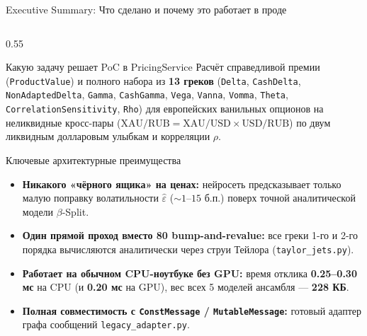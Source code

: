 \documentclass[aspectratio=169, 9pt]{beamer}
\begin{document}
\begin{frame}{Executive Summary: Что сделано и почему это работает в проде}
  \begin{columns}[T]
    \begin{column}{0.55\textwidth}
      \begin{block}{Какую задачу решает PoC в PricingService}
        Расчёт справедливой премии (\texttt{ProductValue}) и полного набора из \textbf{13 греков} (\texttt{Delta}, \texttt{CashDelta}, \texttt{NonAdaptedDelta}, \texttt{Gamma}, \texttt{CashGamma}, \texttt{Vega}, \texttt{Vanna}, \texttt{Vomma}, \texttt{Theta}, \texttt{CorrelationSensitivity}, \texttt{Rho}) для европейских ванильных опционов на неликвидные кросс-пары ($\text{XAU/RUB} = \text{XAU/USD} \times \text{USD/RUB}$) по двум ликвидным долларовым улыбкам и корреляции $\rho$.
      \end{block}

      \begin{exampleblock}{Ключевые архитектурные преимущества}
        \begin{itemize}
          \item \textbf{Никакого «чёрного ящика» на ценах:} нейросеть предсказывает только малую поправку волатильности $\hat{\varepsilon}$ ($\sim 1\text{--}15$ б.п.) поверх точной аналитической модели $\beta$-Split.
          \item \textbf{Один прямой проход вместо 80 bump-and-revalue:} все греки 1-го и 2-го порядка вычисляются аналитически через струи Тейлора (\texttt{taylor\_jets.py}).
          \item \textbf{Работает на обычном CPU-ноутбуке без GPU:} время отклика \textbf{0.25--0.30 мс} на CPU (и \textbf{0.20 мс} на GPU), вес всех 5 моделей ансамбля — \textbf{228 КБ}.
          \item \textbf{Полная совместимость с \texttt{ConstMessage} / \texttt{MutableMessage}:} готовый адаптер графа сообщений \texttt{legacy\_adapter.py}.
        \end{itemize}
      \end{exampleblock}
    \end{column}


\end{columns}
\end{frame}
\end{document}
